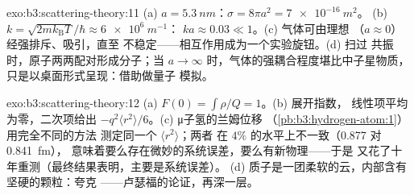 \begin{solution}{exo:b3:scattering-theory:11}
(a) $a = \qty{5.3}{nm}$：$\sigma = 8\pi a^2 = \qty{7e-16}{m^2}$。
(b) $k = \sqrt{2mk_{\text{B}}T}/\hbar \approx \qty{6e6}{m^{-1}}$：
$ka \approx 0.03 \ll 1$。(c) 气体可由理想
（$a \approx 0$）经强排斥、吸引，直至
不稳定——相互作用成为一个实验旋钮。(d) 扫过
共振时，原子两两配对形成分子；当 $a \to
\infty$ 时，气体的强耦合程度堪比中子星物质，
只是以桌面形式呈现：借助做量子
模拟。
\end{solution}

\begin{solution}{exo:b3:scattering-theory:12}
(a) $F(0) = \int\rho/Q = 1$。(b) 展开指数，
线性项平均为零，二次项给出
$-q^2\langle r^2\rangle/6$。(c) μ子氢的兰姆位移
（\cref{pb:b3:hydrogen-atom:1}）用完全不同的方法
测定同一个 $\langle r^2\rangle$；两者
在 $4\%$ 的水平上不一致（0.877 对 \qty{0.841}{fm}），
意味着要么存在微妙的系统误差，要么有新物理——于是
又花了十年重测（最终结果表明，主要是系统误差）。
(d) 质子是一团柔软的云，内部含有坚硬的颗粒：夸克
——卢瑟福的论证，再深一层。
\end{solution}

